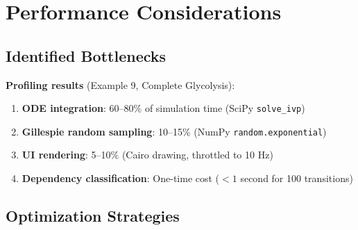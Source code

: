 \section{Performance Considerations}
\label{sec:performance}

\subsection{Identified Bottlenecks}
\label{subsec:bottlenecks}

\textbf{Profiling results} (Example 9, Complete Glycolysis):

\begin{enumerate}
    \item \textbf{ODE integration}: 60--80\% of simulation time (SciPy \texttt{solve\_ivp})
    \item \textbf{Gillespie random sampling}: 10--15\% (NumPy \texttt{random.exponential})
    \item \textbf{UI rendering}: 5--10\% (Cairo drawing, throttled to 10 Hz)
    \item \textbf{Dependency classification}: One-time cost ($<1$ second for 100 transitions)
\end{enumerate}

\subsection{Optimization Strategies}
\label{subsec:optimizations}

